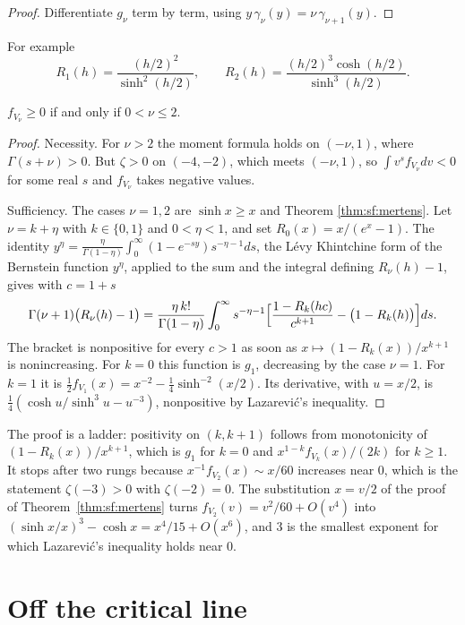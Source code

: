 \begin{proof}
Differentiate $g_\nu$ term by term, using $y\,\gamma_\nu(y)=\nu\,\gamma_{\nu+1}(y)$.
\end{proof}

For example
\[
R_1(h)=\frac{(h/2)^2}{\sinh^2(h/2)},\qquad R_2(h)=\frac{(h/2)^3\cosh(h/2)}{\sinh^3(h/2)} .
\]

\begin{theorem}\label{thm:sf:threshold}
$f_{V_\nu}\ge0$ if and only if $0<\nu\le2$.
\end{theorem}

\begin{proof}
Necessity. For $\nu>2$ the moment formula holds on $(-\nu,1)$, where $\Gamma(s+\nu)>0$. But $\zeta>0$ on $(-4,-2)$, which meets $(-\nu,1)$, so $\int v^sf_{V_\nu}dv<0$ for some real $s$ and $f_{V_\nu}$ takes negative values.

Sufficiency. The cases $\nu=1,2$ are $\sinh x\ge x$ and Theorem \ref{thm:sf:mertens}. Let $\nu=k+\eta$ with $k\in\{0,1\}$ and $0<\eta<1$, and set $R_0(x)=x/(e^x-1)$. The identity $y^\eta=\frac{\eta}{\Gamma(1-\eta)}\int_0^\infty(1-e^{-sy})s^{-\eta-1}ds$, the L\'evy Khintchine form of the Bernstein function $y^\eta$, applied to the sum and the integral defining $R_\nu(h)-1$, gives with $c=1+s$
\[
\Gamma(\nu+1)\bigl(R_\nu(h)-1\bigr)=\frac{\eta\,k!}{\Gamma(1-\eta)}\int_0^\infty s^{-\eta-1}\Bigl[\frac{1-R_k(hc)}{c^{k+1}}-\bigl(1-R_k(h)\bigr)\Bigr]ds .
\]
The bracket is nonpositive for every $c>1$ as soon as $x\mapsto(1-R_k(x))/x^{k+1}$ is nonincreasing. For $k=0$ this function is $g_1$, decreasing by the case $\nu=1$. For $k=1$ it is $\frac12f_{V_1}(x)=x^{-2}-\frac14\sinh^{-2}(x/2)$. Its derivative, with $u=x/2$, is $\frac14(\cosh u/\sinh^3u-u^{-3})$, nonpositive by Lazarevi\'c's inequality.
\end{proof}

The proof is a ladder: positivity on $(k,k+1)$ follows from monotonicity of $(1-R_k(x))/x^{k+1}$, which is $g_1$ for $k=0$ and $x^{1-k}f_{V_k}(x)/(2k)$ for $k\ge1$. It stops after two rungs because $x^{-1}f_{V_2}(x)\sim x/60$ increases near $0$, which is the statement $\zeta(-3)>0$ with $\zeta(-2)=0$. The substitution $x=v/2$ of the proof of Theorem~\ref{thm:sf:mertens} turns $f_{V_2}(v)=v^2/60+O(v^4)$ into $(\sinh x/x)^3-\cosh x=x^4/15+O(x^6)$, and $3$ is the smallest exponent for which Lazarevi\'c's inequality holds near $0$.

\section{Off the critical line}\label{sec:sf:strip}


